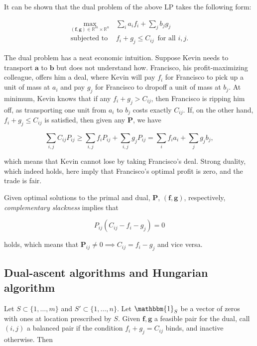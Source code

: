 \documentclass[11pt,reqno]{amsart}
\renewcommand{\b}{\mathbf}
\newcommand{\R}{\mathbb{R}}
\newcommand{\one}{\mathbbm{1}}
\theoremstyle{definition}
\theoremstyle{remark}
\begin{document}
It can be shown that the dual problem of the above LP takes the following form:

\begin{align*}
\max_{(\b f, \b g) \in \R^{m} \times \R^n} \, & \sum_i a_i f_i + \sum_j b_j g_j
\\ 
\text{subjected to } & f_i + g_j \le C_{ij}\, \text{ for all $i,j$}.
\end{align*}

The dual problem has a neat economic intuition. Suppose Kevin needs to transport
$\b a$ to $\b b$ but does not understand how. Francisco, his profit-maximizing
colleague, offers him a deal, where Kevin will pay $f_i$ for Francisco to pick
up a unit of mass at $a_i$ and pay $g_j$ for Francisco to dropoff a unit of mass
at $b_j.$ At minimum, Kevin knows that if any $f_i + g_j > C_ {ij}$, then
Francisco is ripping him off, as transporting one unit from $a_i$ to $b_j$ costs
exactly $C_{ij}$. If, on the other hand, $f_i + g_j \le C_{ij}$ is satisfied,
then given any $\b P$, we have

\[
\sum_{i,j} C_{ij}P_{ij} \ge \sum_{i,j} f_i P_{ij} + \sum_{i,j} g_j P_{ij} =
\sum_i f_i a_i + \sum_j g_j b_j \tag{Weak duality},
\]


which means that Kevin cannot lose by taking Francisco's deal. Strong duality,
which indeed holds, here imply that Francisco's optimal profit is zero, and the
trade is fair.


Given optimal solutions to the primal and dual, $\b P$, $(\b f, \b g)$,
respectively, \emph{complementary slackness} implies that

\[ P_{ij} (C_{ij} - f_i - g_j) = 0 \tag{Complementary slackness} \]

holds, which means that $\b P_{ij} \neq 0 \implies C_{ij} = f_i - g_j$ and
vice versa. 
    
\subsection{Dual-ascent algorithms and Hungarian algorithm}

Let $S \subset \{1,\ldots,m\}$ and $S' \subset \{1,\ldots,n\}.$ Let $\one_S$ be
a vector of zeros with ones at location prescribed by $S$. Given $\b f, \b g$ a
feasible pair for the dual, call $(i,j)$ a balanced pair if the condition $f_i +
g_j = C_{ij}$ binds, and inactive otherwise. Then 
\end{document}
